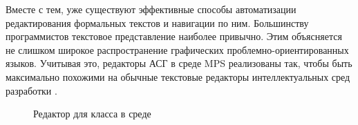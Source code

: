 Вместе с тем, уже существуют эффективные способы автоматизации редактирования формальных текстов и навигации по ним. Большинству программистов текстовое представление наиболее привычно. Этим объясняется не слишком широкое распространение графических проблемно-ориентированных языков. Учитывая это, редакторы АСГ в среде MPS реализованы так, чтобы быть максимально похожими на обычные текстовые редакторы интеллектуальных сред разработки \pic{\ref{fig:ClassInMPS}}.

\begin{figure}
\centering
{}
\caption{Редактор для класса в среде \MPS{}}
\label{fig:ClassInMPS}
\end{figure}
